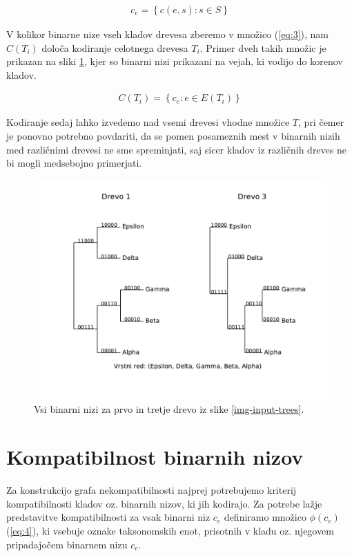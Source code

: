 \documentclass[a4paper, 12pt]{book}
\begin{document}
\begin{align}
	c_e = \left\{ c(e, s): s \in S \right\} \label{eq:2}
\end{align}

V kolikor binarne nize vseh kladov drevesa zberemo v množico (\ref{eq:3}), nam $C(T_i)$ določa kodiranje celotnega drevesa $T_i$. Primer dveh takih množic je prikazan na sliki \ref{img-bistring-trees-example}, kjer so binarni nizi prikazani na vejah, ki vodijo do korenov kladov.

\begin{align}
	C(T_i) = \left\{ c_e : e \in E(T_i) \right\} \label{eq:3}
\end{align}

Kodiranje sedaj lahko izvedemo nad vsemi drevesi vhodne množice $T$, pri čemer je ponovno potrebno povdariti, da se pomen posameznih mest v binarnih nizih med različnimi drevesi ne sme spreminjati, saj sicer kladov iz različnih dreves ne bi mogli medsebojno primerjati. 

\begin{figure}
	\begin{center}
		\includegraphics[scale=0.7, clip=true, trim=0 2cm 0 9mm]{gfx/bitstring_trees.pdf}
	\end{center}
	\caption{Vsi binarni nizi za prvo in tretje drevo iz slike \ref{img-input-trees}.}
	\label{img-bistring-trees-example}
\end{figure}

\section{Kompatibilnost binarnih nizov} 
Za konstrukcijo grafa nekompatibilnosti najprej potrebujemo kriterij kompatibilnosti kladov oz. binarnih nizov, ki jih kodirajo. Za potrebe lažje predstavitve kompatibilnosti za vsak binarni niz $c_e$ definiramo množico $\phi(c_e)$ (\ref{eq:4}), ki vsebuje oznake taksonomskih enot, prisotnih v kladu oz. njegovem pripadajočem binarnem nizu $c_e$. 
\end{document}
